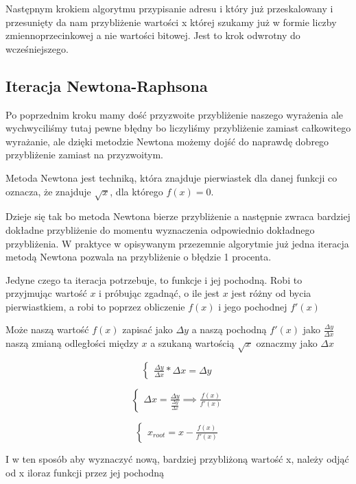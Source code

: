 \documentclass[12pt]{article}
\begin{document}
Następnym krokiem algorytmu przypisanie adresu i który już przeskalowany i przesunięty da nam przybliżenie wartości x której szukamy już w formie liczby zmiennoprzecinkowej a nie wartości bitowej. Jest to krok odwrotny do wcześniejszego.

\subsection{Iteracja Newtona-Raphsona}

Po poprzednim kroku mamy dość przyzwoite przybliżenie naszego wyrażenia ale wychwyciliśmy tutaj pewne błędny bo liczyliśmy przybliżenie zamiast całkowitego wyrażanie, ale dzięki metodzie Newtona możemy dojść do naprawdę dobrego przybliżenie zamiast na przyzwoitym.
\newline

Metoda Newtona jest techniką, która znajduje pierwiastek dla danej funkcji co oznacza, że znajduje $\sqrt{x}$, dla którego $f(x) = 0$.

\hfill \break
Dzieje się tak bo metoda Newtona bierze przybliżenie a następnie zwraca bardziej dokładne przybliżenie do momentu wyznaczenia odpowiednio dokładnego przybliżenia. W praktyce w opisywanym przezemnie algorytmie już jedna iteracja metodą Newtona pozwala na przybliżenie o błędzie 1 procenta.

Jedyne czego ta iteracja potrzebuje, to funkcje i jej pochodną. Robi to przyjmując wartość $x$ i próbując zgadnąć, o ile jest $x$ jest różny od bycia pierwiastkiem, a robi to poprzez obliczenie $f(x)$ i jego pochodnej $f'(x)$

\newpage
\noindent Może naszą wartość $f(x)$ zapisać jako $\Delta{y}$ a naszą pochodną  $f'(x)$ jako $\frac{\Delta{y} }{\Delta{x} }$ naszą zmianą odległości między $x$ a szukaną wartością $\sqrt{x}$ oznaczmy jako $\Delta{x}$

$$ \begin{cases}
\frac{\Delta{y} }{\Delta{x} } * \Delta{x} = \Delta{y}
\end{cases} $$

$$ \begin{cases}
\Delta{x} = \frac{\Delta{y}}{\frac{\Delta{y} }{\Delta{x} }} \implies \frac{f(x)}{f'(x)}
\end{cases} $$

$$ \begin{cases}
x_{root} = x -\frac{f(x)}{f'(x)} 
\end{cases} $$

\noindent I w ten sposób aby wyznaczyć nową, bardziej przybliżoną wartość x, należy odjąć od x iloraz funkcji przez jej pochodną
\end{document}
